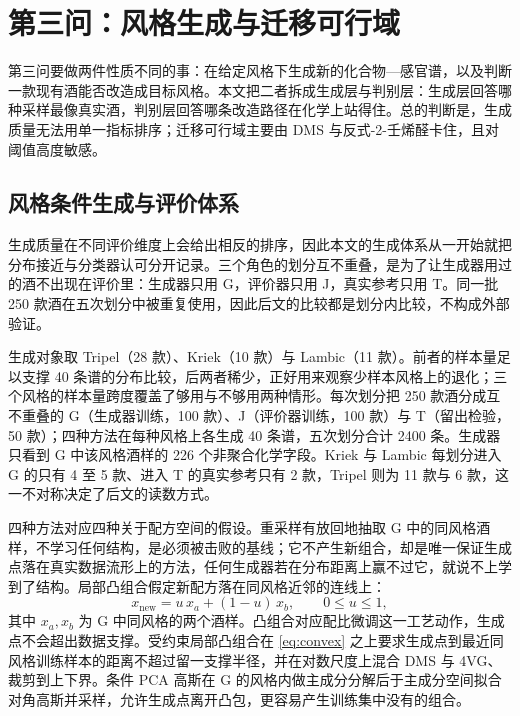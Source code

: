 
\section{第三问：风格生成与迁移可行域}\label{sec:q3}

第三问要做两件性质不同的事：在给定风格下生成新的化合物—感官谱，以及判断一款现有酒能否改造成目标风格。本文把二者拆成生成层与判别层：生成层回答哪种采样最像真实酒，判别层回答哪条改造路径在化学上站得住。总的判断是，生成质量无法用单一指标排序；迁移可行域主要由 DMS 与反式-2-壬烯醛卡住，且对阈值高度敏感。

\subsection{风格条件生成与评价体系}

生成质量在不同评价维度上会给出相反的排序，因此本文的生成体系从一开始就把分布接近与分类器认可分开记录。三个角色的划分互不重叠，是为了让生成器用过的酒不出现在评价里：生成器只用 G，评价器只用 J，真实参考只用 T。同一批 250 款酒在五次划分中被重复使用，因此后文的比较都是划分内比较，不构成外部验证。

生成对象取 Tripel（28 款）、Kriek（10 款）与 Lambic（11 款）。前者的样本量足以支撑 40 条谱的分布比较，后两者稀少，正好用来观察少样本风格上的退化；三个风格的样本量跨度覆盖了够用与不够用两种情形。每次划分把 250 款酒分成互不重叠的 G（生成器训练，100 款）、J（评价器训练，100 款）与 T（留出检验，50 款）；四种方法在每种风格上各生成 40 条谱，五次划分合计 2400 条。生成器只看到 G 中该风格酒样的 226 个非聚合化学字段。Kriek 与 Lambic 每划分进入 G 的只有 4 至 5 款、进入 T 的真实参考只有 2 款，Tripel 则为 11 款与 6 款，这一不对称决定了后文的读数方式。

四种方法对应四种关于配方空间的假设。重采样有放回地抽取 G 中的同风格酒样，不学习任何结构，是必须被击败的基线\cite{efron1993}；它不产生新组合，却是唯一保证生成点落在真实数据流形上的方法，任何生成器若在分布距离上赢不过它，就说不上学到了结构。局部凸组合假定新配方落在同风格近邻的连线上：
\begin{equation}
x_{\mathrm{new}}=u\,x_{a}+(1-u)\,x_{b},\qquad 0\le u\le 1,
\label{eq:convex}
\end{equation}
其中 $x_a,x_b$ 为 G 中同风格的两个酒样。凸组合对应配比微调这一工艺动作，生成点不会超出数据支撑。受约束局部凸组合在 \eqref{eq:convex} 之上要求生成点到最近同风格训练样本的距离不超过留一支撑半径，并在对数尺度上混合 DMS 与 4VG、裁剪到上下界。条件 PCA 高斯在 G 的风格内做主成分分解后于主成分空间拟合对角高斯并采样，允许生成点离开凸包，更容易产生训练集中没有的组合。

